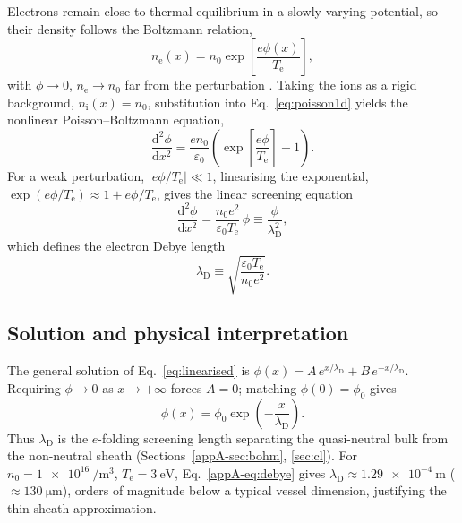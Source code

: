 Electrons remain close to thermal equilibrium in a slowly varying potential, so their density follows the Boltzmann relation,
\begin{equation}
n_{\mathrm{e}}(x) = n_{0}\exp\!\left[\frac{e\phi(x)}{T_{\mathrm{e}}}\right],
\label{appA-eq:boltzmann}
\end{equation}
with $\phi \to 0$, $n_{\mathrm{e}} \to n_{0}$ far from the perturbation \cite{ref0013,ref0670}. Taking the ions as a rigid background, $n_{\mathrm{i}}(x) = n_{0}$, substitution into Eq.~\eqref{eq:poisson1d} yields the nonlinear Poisson--Boltzmann equation,
\begin{equation}
\frac{\mathrm{d}^{2}\phi}{\mathrm{d}x^{2}} = \frac{e n_{0}}{\varepsilon_{0}}\left(\exp\!\left[\frac{e\phi}{T_{\mathrm{e}}}\right] - 1\right).
\label{eq:pb_nonlinear}
\end{equation}
For a weak perturbation, $|e\phi/T_{\mathrm{e}}| \ll 1$, linearising the exponential, $\exp(e\phi/T_{\mathrm{e}}) \approx 1 + e\phi/T_{\mathrm{e}}$, gives the linear screening equation
\begin{equation}
\frac{\mathrm{d}^{2}\phi}{\mathrm{d}x^{2}} = \frac{n_{0}e^{2}}{\varepsilon_{0}T_{\mathrm{e}}}\,\phi \equiv \frac{\phi}{\lambda_{\mathrm{D}}^{2}},
\label{eq:linearised}
\end{equation}
which defines the electron Debye length
\begin{equation}
\boxed{\lambda_{\mathrm{D}} \equiv \sqrt{\frac{\varepsilon_{0}T_{\mathrm{e}}}{n_{0}e^{2}}}}.
\label{appA-eq:debye}
\end{equation}

\subsection{Solution and physical interpretation}

The general solution of Eq.~\eqref{eq:linearised} is $\phi(x) = A\,e^{x/\lambda_{\mathrm{D}}} + B\,e^{-x/\lambda_{\mathrm{D}}}$. Requiring $\phi \to 0$ as $x \to +\infty$ forces $A=0$; matching $\phi(0) = \phi_{0}$ gives
\begin{equation}
\phi(x) = \phi_{0}\exp\!\left(-\frac{x}{\lambda_{\mathrm{D}}}\right).
\label{eq:debye_profile}
\end{equation}
Thus $\lambda_{\mathrm{D}}$ is the $e$-folding screening length separating the quasi-neutral bulk from the non-neutral sheath (Sections~\ref{appA-sec:bohm}, \ref{sec:cl}). For $n_{0} = \SI{1e16}{\per\cubic\meter}$, $T_{\mathrm{e}} = \SI{3}{\electronvolt}$, Eq.~\eqref{appA-eq:debye} gives $\lambda_{\mathrm{D}} \approx \SI{1.29e-4}{\meter}$ ($\approx\SI{130}{\micro\meter}$), orders of magnitude below a typical vessel dimension, justifying the thin-sheath approximation.

